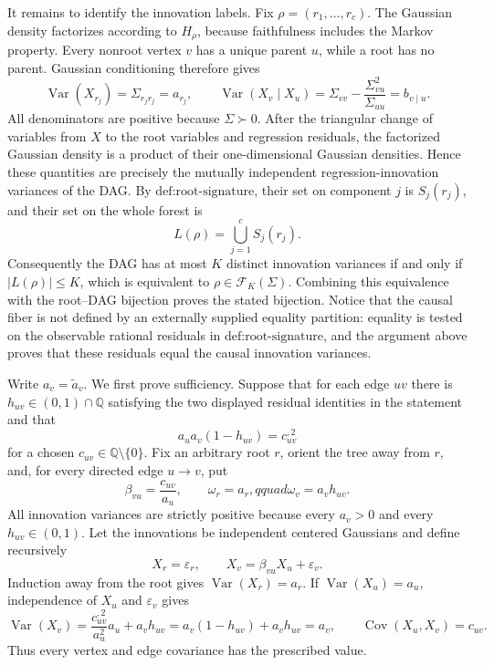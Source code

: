 It remains to identify the innovation labels.  Fix \(\rho=(r_1,\ldots,r_c)\).  The Gaussian density factorizes according to \(H_\rho\), because faithfulness includes the Markov property.  Every nonroot vertex \(v\) has a unique parent \(u\), while a root has no parent.  Gaussian conditioning therefore gives
\[
 \operatorname{Var}(X_{r_j})=\Sigma_{r_jr_j}=a_{r_j},
 \qquad
 \operatorname{Var}(X_v\mid X_u)
 =\Sigma_{vv}-\frac{\Sigma_{vu}^{2}}{\Sigma_{uu}}
 =b_{v\mid u}.
\]
All denominators are positive because \(\Sigma\succ0\).  After the triangular change of variables from \(X\) to the root variables and regression residuals, the factorized Gaussian density is a product of their one-dimensional Gaussian densities.  Hence these quantities are precisely the mutually independent regression-innovation variances of the DAG.  By \(\text{def:root-signature}\), their set on component \(j\) is \(S_j(r_j)\), and their set on the whole forest is
\[
 L(\rho)=\bigcup_{j=1}^{c}S_j(r_j).
\]
Consequently the DAG has at most \(K\) distinct innovation variances if and only if \(|L(\rho)|\le K\), which is equivalent to \(\rho\in\mathcal F_K(\Sigma)\).  Combining this equivalence with the root--DAG bijection proves the stated bijection.  Notice that the causal fiber is not defined by an externally supplied equality partition: equality is tested on the observable rational residuals in \(\text{def:root-signature}\), and the argument above proves that these residuals equal the causal innovation variances.

Write \(a_v=\widetilde a_v\).  We first prove sufficiency.  Suppose that for each edge \(uv\) there is \(h_{uv}\in(0,1)\cap\mathbb Q\) satisfying the two displayed residual identities in the statement and that
\[
 a_u a_v(1-h_{uv})=c_{uv}^{,2}
\]
for a chosen \(c_{uv}\in\mathbb Q\setminus\{0\}\).  Fix an arbitrary root \(r\), orient the tree away from \(r\), and, for every directed edge \(u\to v\), put
\[
 \beta_{vu}=\frac{c_{uv}}{a_u},\qquad
 \omega_r=a_r,qquad
 \omega_v=a_vh_{uv}.
\]
All innovation variances are strictly positive because every \(a_v>0\) and every \(h_{uv}\in(0,1)\).  Let the innovations be independent centered Gaussians and define recursively
\[
 X_r=\varepsilon_r,
 \qquad
 X_v=\beta_{vu}X_u+\varepsilon_v.
\]
Induction away from the root gives \(\operatorname{Var}(X_r)=a_r\).  If \(\operatorname{Var}(X_u)=a_u\), independence of \(X_u\) and \(\varepsilon_v\) gives
\[
 \operatorname{Var}(X_v)
 =\frac{c_{uv}^{,2}}{a_u^2}a_u+a_vh_{uv}
 =a_v(1-h_{uv})+a_vh_{uv}=a_v,
 \qquad
 \operatorname{Cov}(X_u,X_v)=c_{uv}.
\]
Thus every vertex and edge covariance has the prescribed value.

